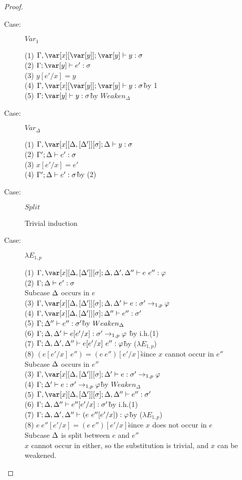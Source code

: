 \begin{proof}
\begin{description}
\item[Case:] $Var_1$
\begin{tabbing}
  (1) $\G,\x[\y]; \y \vdash y : \s$\\
  (2) $\G; \y \vdash e' : \s$\\
  (3) $y[e'/x] = y$\\
  (4) $\G,\x[\y]; \y \vdash y : \s$\`by 1\\ 
  (5) $\G; \y\vdash y : \s$\` by $Weaken_\Delta$\\
\end{tabbing}

\item[Case:] $Var_\Delta$
\begin{tabbing}
    (1) $\G, \xD; \D \vdash y : \s$\\
    (2) $\Gamma'; \Delta \vdash e' : \sigma$\\
    (3) $x[e'/x] = e'$\\
    (4) $\Gamma'; \Delta \vdash e' : \sigma$\` by (2)\\
\end{tabbing}

\item[Case:] $Split$
\begin{tabbing}
    Trivial induction
\end{tabbing}

\item[Case:] $\lambda E_{1,p}$
\begin{tabbing}
    (1) $\G, \xD; \D,\D',\D'' \vdash e~e'' : \varphi$\\
    (2) $\Gamma; \Delta \vdash e' : \sigma$\\
    Subcase $\Delta$ occurs in $e$\\
    (3) $\G, \xD; \D,\D' \vdash e : \s' \to_{1,p} \vp$\\
    (4) $\G, \xD; \D'' \vdash e'' : \s'$\\
    (5) $\Gamma; \Delta'' \vdash e'' : \sigma'$\` by $Weaken_\Delta$\\
    (6) $\Gamma; \Delta,\Delta' \vdash e[e'/x] : \sigma' \to_{1,p} \varphi$ \` by i.h.(1)\\
    (7) $\Gamma;\Delta, \Delta', \Delta'' \vdash e[e'/x]~e'' : \varphi$\` by ($\lambda E_{1,p}$)\\
    (8) $(e[e'/x]~e'')=(e~e'')[e'/x]$\` since $x$ cannot occur in $e''$\\
    Subcase $\Delta$ occurs in $e''$\\
    (3) $\G, \xD; \D' \vdash e : \s' \to_{1,p} \vp$\\
    (4) $\Gamma; \Delta' \vdash e : \sigma' \to_{1,p} \varphi$\` by $Weaken_\Delta$\\
    (5) $\G,\xD; \D, \D'' \vdash e'' : \s'$\\
    (6) $\Gamma; \Delta, \Delta'' \vdash e''[e'/x] : \sigma'$\` by i.h.(1)\\
    (7) $\Gamma; \Delta,\Delta',\Delta'' \vdash (e~e''[e'/x]) : \varphi$\` by ($\lambda E_{1,p}$)\\
    (8) $e~e''[e'/x] = (e~e'')[e'/x]$\`since $x$ does not occur in $e$\\
    Subcase $\Delta$ is split between $e$ and $e''$\\
    $x$ cannot occur in either, so the substitution is trivial, and $x$ can be weakened.


\end{tabbing}
\end{description}
\end{proof}
